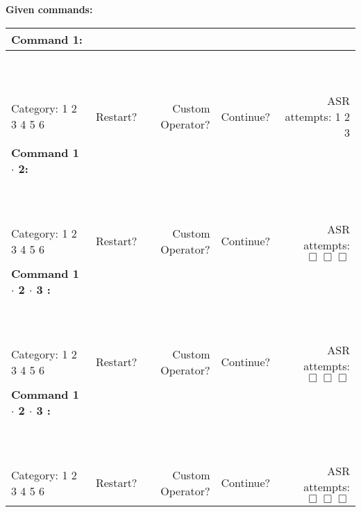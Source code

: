 {\LARGE\textbf{Given commands:}}\vspace{4mm}

\begin{table}[h]
\begin{tabularx}{\textwidth}{X r r r r}
	\textbf{\large Command 1:} & ~ & ~ & ~ & ~ \\ \hline
	\multicolumn{5}{c}{\vspace{5mm}~}  \\ \hline
	\multicolumn{5}{c}{\vspace{5mm}~}  \\ \hline
	Category: 1 2 3 4 5 6 \vspace{8mm} &
	Restart? & Custom Operator? & Continue? & ASR attempts: 1 2 3 \\

	\textbf{\large Command 1 $\cdot$ 2:} & ~ & ~ & ~ & ~ \\ \hline
	\multicolumn{5}{c}{\vspace{5mm}~}  \\ \hline
	\multicolumn{5}{c}{\vspace{5mm}~}  \\ \hline
	Category: 1 2 3 4 5 6 \vspace{8mm} &
	Restart? & Custom Operator? & Continue? & ASR attempts: $\Box \Box \Box$ \\
	
	\textbf{\large Command 1 $\cdot$ 2 $\cdot$ 3 :} & ~ & ~ & ~ & ~ \\ \hline
	\multicolumn{5}{c}{\vspace{5mm}~}  \\ \hline
	\multicolumn{5}{c}{\vspace{5mm}~}  \\ \hline
	Category: 1 2 3 4 5 6 \vspace{8mm} &
	Restart? & Custom Operator? & Continue? & ASR attempts: $\Box \Box \Box$ \\

	\textbf{\large Command 1 $\cdot$ 2 $\cdot$ 3 :} & ~ & ~ & ~ & ~ \\ \hline
	\multicolumn{5}{c}{\vspace{5mm}~}  \\ \hline
	\multicolumn{5}{c}{\vspace{5mm}~}  \\ \hline
	Category: 1 2 3 4 5 6 \vspace{8mm} &
	Restart? & Custom Operator? & Continue? & ASR attempts: $\Box \Box \Box$ \\
\end{tabularx}
\end{table}
\vspace*{\fill}

